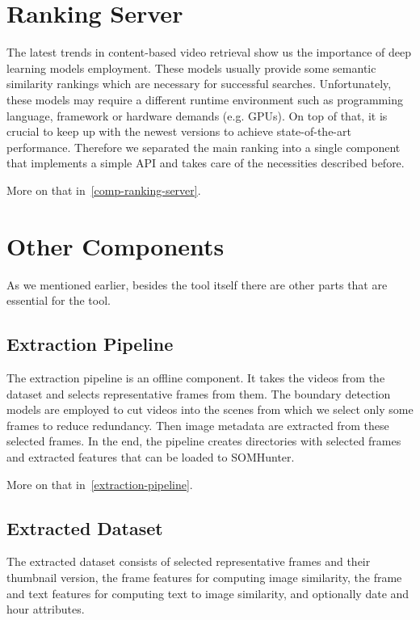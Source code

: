 \section{Ranking Server}

The latest trends in content-based video retrieval show us the importance of deep learning models employment. These models usually provide some semantic similarity rankings which are necessary for successful searches. Unfortunately, these models may require a different runtime environment such as programming language, framework or hardware demands (e.g. GPUs). On top of that, it is crucial to keep up with the newest versions to achieve state-of-the-art performance. Therefore we separated the main ranking into a single component that implements a simple API and takes care of the necessities described before.

More on that in~\cref{comp-ranking-server}.


\section{Other Components}
As we mentioned earlier, besides the tool itself there are other parts that are essential for the tool.

\subsection{Extraction Pipeline}

The extraction pipeline is an offline component. It takes the videos from the dataset and selects representative frames from them. The boundary detection models are employed to cut videos into the scenes from which we select only some frames to reduce redundancy. Then image metadata are extracted from these selected frames. In the end, the pipeline creates directories with selected frames and extracted features that can be loaded to SOMHunter.

More on that in~\cref{extraction-pipeline}.

\subsection{Extracted Dataset}

The extracted dataset consists of selected representative frames and their thumbnail version, the frame features for computing image similarity, the frame and text features for computing text to image similarity, and optionally date and hour attributes.


